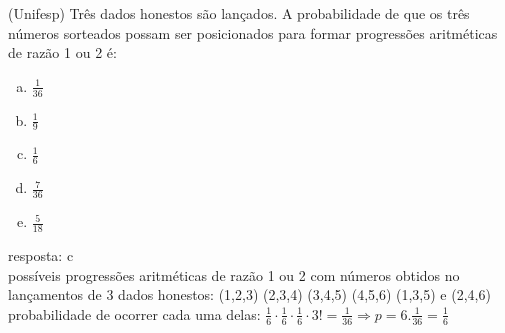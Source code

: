 \begin{ex}
 (Unifesp) Três dados honestos são lançados. A probabilidade de que os três números sorteados possam ser posicionados para formar progressões aritméticas  de razão 1 ou 2 é:
    \begin{enumerate}[(a)]
    \item $\frac{1}{36}$
    \item $\frac{1}{9}$
    \item $\frac{1}{6}$
    \item $\frac{7}{36}$
    \item $\frac{5}{18}$
    \end{enumerate}
      \begin{sol}
       resposta: c  \\
       possíveis progressões aritméticas de razão 1 ou 2 com números obtidos no lançamentos de 3 dados honestos: (1,2,3) (2,3,4) (3,4,5) (4,5,6) (1,3,5) e (2,4,6)  \\
       probabilidade de ocorrer cada uma delas: $\frac{1}{6}\cdot\frac{1}{6}\cdot\frac{1}{6}\cdot3!=\frac{1}{36}\Longrightarrow p=6.\frac{1}{36}=\frac{1}{6}$
      \end{sol}
\end{ex}